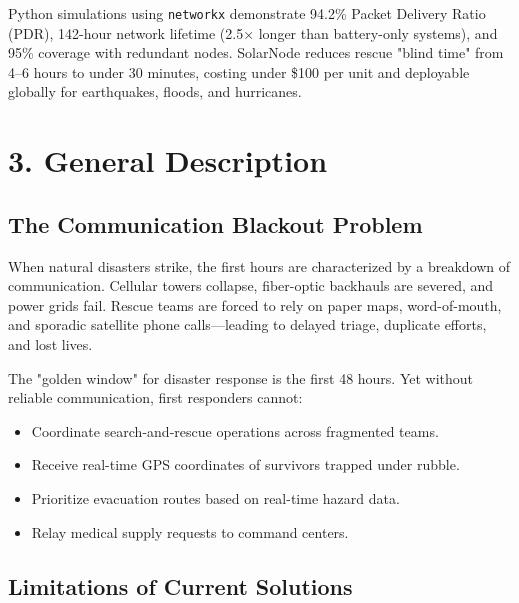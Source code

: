 \documentclass[12pt,a4paper]{article}
\begin{document}
Python simulations using \texttt{networkx} demonstrate 94.2\% Packet Delivery Ratio (PDR), 142-hour network lifetime (2.5× longer than battery-only systems), and 95\% coverage with redundant nodes. SolarNode reduces rescue "blind time" from 4–6 hours to under 30 minutes, costing under \$100 per unit and deployable globally for earthquakes, floods, and hurricanes.

\section*{3. General Description}

\subsection*{The Communication Blackout Problem}

When natural disasters strike, the first hours are characterized by a breakdown of communication. Cellular towers collapse, fiber-optic backhauls are severed, and power grids fail. Rescue teams are forced to rely on paper maps, word-of-mouth, and sporadic satellite phone calls—leading to delayed triage, duplicate efforts, and lost lives.

The "golden window" for disaster response is the first 48 hours. Yet without reliable communication, first responders cannot:
\begin{itemize}
    \item Coordinate search-and-rescue operations across fragmented teams.
    \item Receive real-time GPS coordinates of survivors trapped under rubble.
    \item Prioritize evacuation routes based on real-time hazard data.
    \item Relay medical supply requests to command centers.
\end{itemize}

\subsection*{Limitations of Current Solutions}
\end{document}
